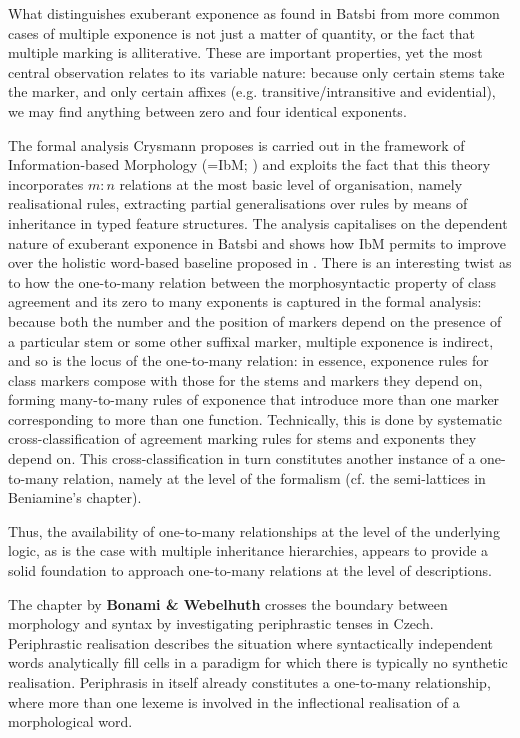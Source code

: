 \documentclass[output=paper]{langscibook}
\begin{document}
What distinguishes exuberant exponence as found in Batsbi from more
common cases of multiple exponence is not just a matter of quantity, or
the fact that multiple marking is alliterative. These are important
properties, yet the most central observation relates to its variable
nature: because only certain stems take the marker, and only certain
affixes (e.g. transitive/intransitive and evidential), we may find
anything between zero and four identical exponents.

The formal analysis Crysmann proposes is carried out in the framework
of Information-based Morphology (=IbM; \citealp{Crysmann:Bonami:2016}) and
exploits the fact that this theory incorporates $m:n$ relations at the
most basic level of organisation, namely realisational rules,
extracting partial generalisations over rules by means of inheritance
in typed feature structures. The analysis capitalises on the dependent
nature of exuberant exponence in Batsbi and shows how IbM permits to
improve over the holistic word-based baseline proposed in
\citet{Harris09}. There is an interesting twist as to how the
one-to-many relation between the morphosyntactic property of class
agreement and its zero to many exponents is captured in the formal
analysis: because both the number and the position of markers depend
on the presence of a particular stem or some other suffixal marker,
multiple exponence is indirect, and so is the locus of the one-to-many
relation: in essence, exponence rules for class markers compose with
those for the stems and markers they depend on, forming many-to-many
rules of exponence that introduce more than one marker corresponding
to more than one function. Technically, this is done by systematic
cross-classification of agreement marking rules for stems and
exponents they depend on. This cross-classification in turn
constitutes another instance of a one-to-many relation, namely at the
level of the formalism (cf. the semi-lattices in Beniamine's chapter).

Thus, the availability of one-to-many relationships at the level of
the underlying logic, as is the case with multiple inheritance
hierarchies, appears to provide a solid foundation to approach
one-to-many relations at the level of descriptions.

The chapter by \textbf{Bonami \& Webelhuth} crosses the boundary
between morphology and syntax by investigating periphrastic tenses in
Czech. Periphrastic realisation describes the situation where
syntactically independent words analytically fill cells in a paradigm
for which there is typically no synthetic realisation. Periphrasis
in itself already constitutes a one-to-many relationship, where more
than one lexeme is involved in the inflectional realisation of a
morphological word.
\end{document}
